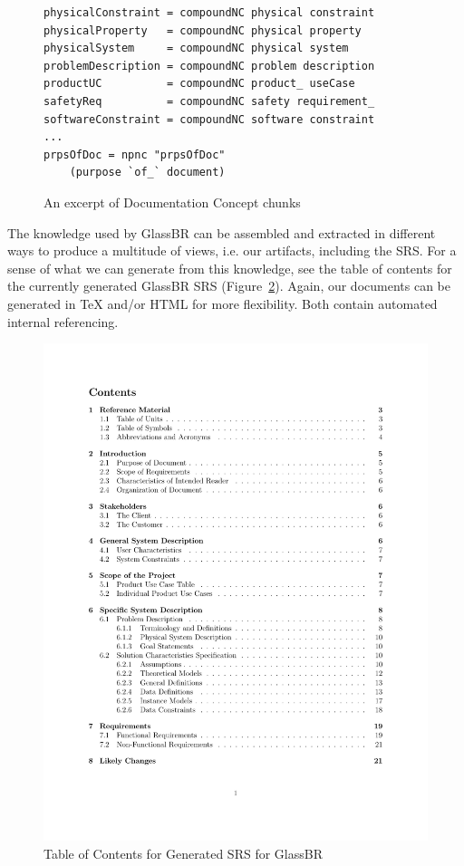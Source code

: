 \documentclass[sigconf]{acmart}
\begin{document}
{\begin{figure}%
\begin{lstlisting}[frame=single, showstringspaces=false, basicstyle=\small, upquote=false]
physicalConstraint = compoundNC physical constraint
physicalProperty   = compoundNC physical property
physicalSystem     = compoundNC physical system
problemDescription = compoundNC problem description
productUC          = compoundNC product_ useCase
safetyReq          = compoundNC safety requirement_
softwareConstraint = compoundNC software constraint
...
prpsOfDoc = npnc "prpsOfDoc" 
    (purpose `of_` document)

\end{lstlisting}
\caption{An excerpt of Documentation Concept chunks}
\label{Fig_docConcepts}
\end{figure}

The knowledge used by GlassBR can be assembled and extracted
in different ways to produce a multitude of views, i.e. our artifacts, including
the SRS. For a sense of what we can generate from this knowledge, see the table
of contents for the currently generated GlassBR SRS
(Figure~\ref{Fig_ToCGlassBRSRS}). Again, our documents can be generated in TeX
and/or HTML for more flexibility. Both contain automated internal referencing.

\begin{figure}
\begin{center}
\includegraphics[scale=0.5]{./figures/TofC.pdf}
\end{center}
\caption{Table of Contents for Generated SRS for GlassBR}
\label{Fig_ToCGlassBRSRS}
\end{figure}

}
\end{document}
